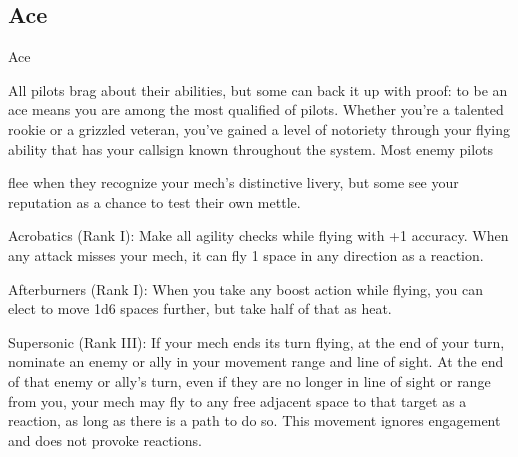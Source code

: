 \subsection{Ace}

                                                       Ace

All pilots brag about their abilities, but some can back it up with proof: to be an ace means you are among
the most qualified of pilots. Whether you’re a talented rookie or a grizzled veteran, you’ve gained a level of
notoriety through your flying ability that has your callsign known throughout the system. Most enemy pilots

flee when they recognize your mech’s distinctive livery, but some see your reputation as a chance to test
their own mettle.

Acrobatics  (Rank I): Make all agility checks while flying with +1 accuracy. When any attack
misses your mech, it can fly 1 space in any direction as a reaction.

Afterburners  (Rank I): When you take any boost action while flying, you can elect to move 1d6
spaces further, but take half of that as heat.

Supersonic (Rank III): If your mech ends its turn flying, at the end of your turn, nominate an
enemy or ally in your movement range and line of sight. At the end of that enemy or ally’s turn,
even if they are no longer in line of sight or range from you, your mech may fly to any free
adjacent space to that target as a reaction, as long as there is a path to do so. This movement
ignores engagement and does not provoke reactions.
